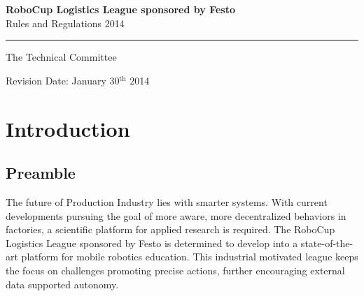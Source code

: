 \documentclass[12pt,twoside]{article}
\begin{document}


\begin{titlepage}
  \vspace*{5cm}
  \begin{center}
    \begin{LARGE}
      
      {\bf RoboCup Logistics League sponsored by Festo}\\[2ex]
      {\Large Rules and Regulations 2014}\\[4ex]
    \end{LARGE}
    \hrule
    
    {\LARGE\vspace*{4ex}}
    \begin{Large}
      The Technical Committee\\[6ex]
    \end{Large}
    \vfill
    Revision Date: January 30$^\mathrm{th}$ 2014
  \end{center}
  
\end{titlepage}
\thispagestyle{empty}
\pagebreak
\clearpage

\setcounter{page}{1}
\tableofcontents
\newpage
\cleardoublepage

\setcounter{page}{1}

\section{Introduction} \label{sec:intro}

\subsection*{Preamble} \label{sec:preamble}

The future of Production Industry lies with smarter systems.  With
current developments pursuing the goal of more aware, more
decentralized behaviors in factories, a scientific platform for
applied research is required.  The RoboCup Logistics League sponsored
by Festo is determined to develop into a state-of-the-art platform for
mobile robotics education. This industrial motivated league keeps the
focus on challenges promoting precise actions, further encouraging
external data supported autonomy.
\end{document}
